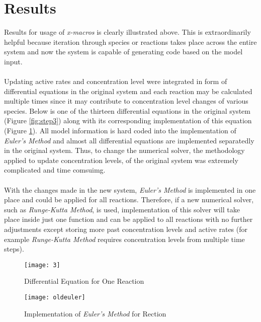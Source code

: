 \documentclass[../thesis.tex]{subfiles}
\begin{document}
\section{Results}
Results for usage of \textit{x-macros} is clearly illustrated above. This is extraordinarily helpful because iteration through species or reactions takes place across the entire system and now the system is capable of generating code based on the model input.\\
\\
Updating active rates and concentration level were integrated in form of differential equations in the original system and each reaction may be calculated multiple times since it may contribute to concentration level changes of various species. Below is one of the thirteen differential equations in the original system (Figure \ref{fig:step3}) along with its corresponding implementation of this equation (Figure \ref{fig:oldeuler}). All model information is hard coded into the implementation of \textit{Euler's Method} and almost all differential equations are implemented separatedly in the original system. Thus, to change the numerical solver, the methodology applied to update concentration levels, of the original system was extremely complicated and time comsuimg. \\
\\
With the changes made in the new system, \textit{Euler's Method} is implemented in one place and could be applied for all reactions. Therefore, if a new numerical solver, such as \textit{Runge-Kutta Method},  is used, implementation of this solver will take place inside just one function and can be applied to all reactions with no further adjustments except storing more past concentration levels and active rates (for example \textit{Runge-Kutta Method} requires concentration levels from multiple time steps). 
 \begin{figure}[h]
\centering
\texttt{[image: 3]}
\caption{Differential Equation for One Reaction}
\label{fig:step3}
\texttt{[image: oldeuler]}
\caption{Implementation of \textit{Euler's Method} for Rection}
\label{fig:oldeuler}
\end{figure}
\end{document}

